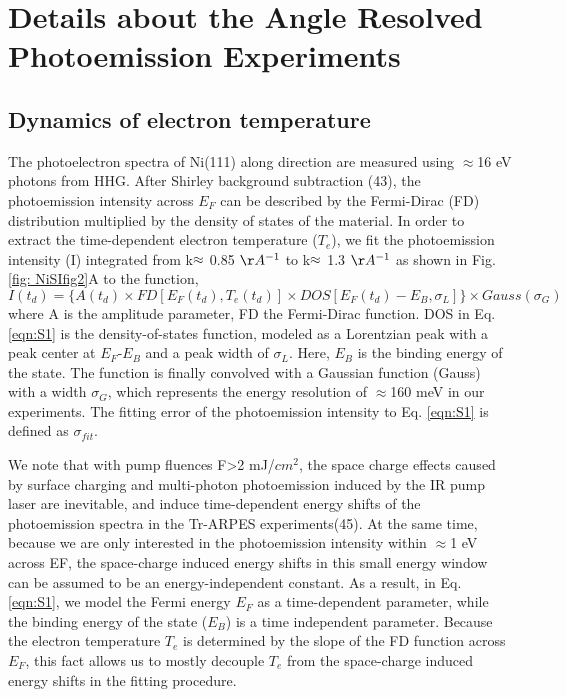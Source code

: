 \chapter{Details about the Angle Resolved Photoemission Experiments}	%

\section{Dynamics of electron temperature}
The photoelectron spectra of Ni(111) along  direction are measured using $\approx$16 eV photons from HHG. After Shirley background subtraction (43), the photoemission intensity across $E_{F}$ can be described by the Fermi-Dirac (FD) distribution multiplied by the density of states of the material. In order to extract the time-dependent electron temperature ($T_e$), we fit the photoemission intensity (I) integrated from k$\/\/ \approx$ 0.85 $\AA^{-1}$  to k$\/\/ \approx$ 1.3 $\AA^{-1}$ as shown in Fig. \ref{fig: NiSIfig2}A to the function,
\begin{equation}
I(t_{d})=\{A(t_d)\times FD[E_F(t_d),T_e(t_d)]\times DOS[E_F(t_d)-E_B,\sigma_L]\}\times\textit{Gauss}(\sigma_G)
\label{eqn:S1}
\end{equation}
where A is the amplitude parameter, FD the Fermi-Dirac function. DOS in Eq. \ref{eqn:S1} is the density-of-states function, modeled as a Lorentzian peak with a peak center at $E_F$-$E_B$ and a peak width of $\sigma_L$. Here, $E_B$ is the binding energy of the state. The function is finally convolved with a Gaussian function (Gauss) with a width $\sigma_G$, which represents the energy resolution of $\approx$160 meV in our experiments. The fitting error of the photoemission intensity to Eq. \ref{eqn:S1} is defined as $\sigma_{fit}$.

We note that with pump fluences F>2 mJ/$cm^2$, the space charge effects caused by surface charging and multi-photon photoemission induced by the IR pump laser are inevitable, and induce time-dependent energy shifts of the photoemission spectra in the Tr-ARPES experiments(45). At the same time, because we are only interested in the photoemission intensity within $\approx$1 eV across EF, the space-charge induced energy shifts in this small energy window can be assumed to be an energy-independent constant. As a result, in Eq. \ref{eqn:S1}, we model the Fermi energy $E_F$ as a time-dependent parameter, while the binding energy of the state ($E_B$) is a time independent parameter. Because the electron temperature $T_e$ is determined by the slope of the FD function across $E_F$, this fact allows us to mostly decouple $T_e$ from the space-charge induced energy shifts in the fitting procedure.

